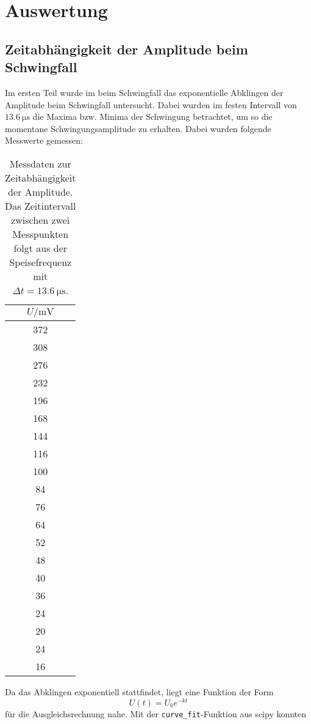 \section{Auswertung}
\label{sec:Auswertung}

\subsection{Zeitabhängigkeit der Amplitude beim Schwingfall}
\label{sec:Zeitabhängigkeit der Amplitude beim Schwingfall}
Im ersten Teil wurde im beim Schwingfall das exponentielle Abklingen der Amplitude beim
Schwingfall untersucht. Dabei wurden im festen Intervall von $\SI{13.6}{\micro\second}$
die Maxima bzw. Minima der Schwingung betrachtet, um so die momentane Schwingungsamplitude
zu erhalten. Dabei wurden folgende Messwerte gemessen:
\begin{table}
	\centering
	\caption{Messdaten zur Zeitabhängigkeit der Amplitude. Das Zeitintervall zwischen
	zwei Messpunkten folgt aus der Speisefrequenz mit $\Delta t =
\SI{13.6}{\micro\second}$.}
	\label{tab:Messwerte-5a}
	\begin{tabular}{c}
		\toprule
		$U / \si{\milli\volt}$\\
		\midrule
		372	\\
		308	\\
		276	\\
		232	\\
		196	\\
		168	\\
		144	\\
		116	\\
		100	\\
		84 	\\
		76 	\\
		64 	\\
		52 	\\
		48 	\\
		40 	\\
		36 	\\
		24 	\\
		20 	\\
		24 	\\
		16 	\\
		\bottomrule
	\end{tabular}
\end{table}
Da das Abklingen exponentiell stattfindet, liegt eine Funktion der Form
\begin{equation}
	U(t) = U_0 e^{-kt}
\end{equation}
für die Ausgleichsrechnung nahe. Mit der \texttt{curve\_fit}-Funktion aus scipy konnten

